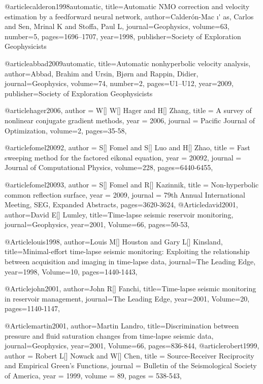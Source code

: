 @article{calderon1998automatic,
  title={Automatic NMO correction and velocity estimation by a feedforward neural network},
  author={Calder{\'o}n-Mac {\i}{\'{}} as, Carlos and Sen, Mrinal K and Stoffa, Paul L},
  journal={Geophysics},
  volume={63},
  number={5},
  pages={1696--1707},
  year={1998},
  publisher={Society of Exploration Geophysicists}
}

@article{abbad2009automatic,
  title={Automatic nonhyperbolic velocity analysis},
  author={Abbad, Brahim and Ursin, Bj{\o}rn and Rappin, Didier},
  journal={Geophysics},
  volume={74},
  number={2},
  pages={U1--U12},
  year={2009},
  publisher={Society of Exploration Geophysicists}
}

@article{hager2006,
  author =	 {W[] W[] Hager and H[] Zhang},
  title =	 {A survey of nonlinear conjugate gradient methods},
  year =	 2006,
  journal =	 {Pacific Journal of Optimization},
  volume={2},
 pages=35-58,
}

@article{fomel20092,
  author =	 {S[] Fomel and S[] Luo and H[] Zhao},
  title =	 {Fast sweeping method for the factored eikonal equation},
  year =	 20092,
  journal =	 {Journal of Computational Physics},
  volume={228},
 pages=6440-6455,
}

@article{fomel20093,
  author =	 {S[] Fomel and R[] Kazinnik},
  title =	 {Non-hyperbolic common reflection surface},
  year =	 2009,
  journal =	 {79th Annual International Meeting, SEG, Expanded Abstracts},
 pages=3620-3624,
}
@Article{david2001,
  author={David E[] Lumley},
  title={Time-lapse seismic reservoir monitoring},
  journal={Geophysics},
  year=2001,
  Volume=66,
  pages={50-53},
}

@Article{louis1998,
  author={Louis M[] Houston and Gary L[] Kinsland},
  title={Minimal-effort time-lapse seismic monitoring: Exploiting the relationship between acquisition and imaging in time-lapse data},
  journal={The Leading Edge},
  year=1998,
  Volume=10,
  pages={1440-1443},
}

@Article{john2001,
  author={John R[] Fanchi},
  title={Time-lapse seismic monitoring in reservoir management},
  journal={The Leading Edge},
  year=2001,
  Volume=20,
  pages={1140-1147},
}

@Article{martin2001,
  author={Martin Landro},
  title={Discrimination between pressure and fluid saturation changes from time‐lapse seismic data},
  journal={Geophysics},
  year=2001,
  Volume=66,
  pages={836-844},
}
@article{robert1999,
  author =	 {Robert L[] Nowack and W[] Chen},
  title =	 {Source-Receiver Reciprocity and Empirical {G}reen's Functions},
  journal = 	 {Bulletin of the Seismological Society of America},
  year = 	 1999,
  volume =	 89,
  pages =	 {538-543},
}

